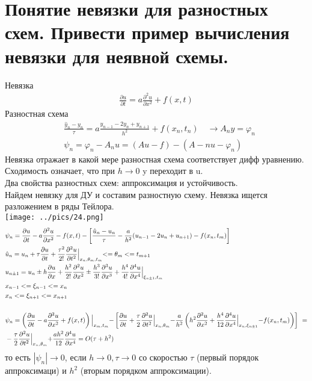 \documentclass[12pt,a4paper]{article}
\begin{document}
	\section{Понятие невязки для разностных схем. Привести пример вычисления невязки для неявной схемы.}	
	Невязка\\
	\begin{align*}
	\frac{\partial u}{\partial t} = a \frac{\partial^2 u}{\partial x^2} + f(x,t)
	\end{align*}
	Разностная схема \\
	\begin{align*}
	&\frac{\hat{y}_n - y_n}{\tau} = a \frac{y_{n-1} - 2y_n + y_{n+1}}{h^2} + f(x_n, t_n) \quad \longrightarrow A_n y = \varphi_n\\
	&\psi_n = \varphi_n - A_n u = (Au - f)-(A-nu-\varphi_n)
	\end{align*}
	Невязка отражает в какой мере разностная схема соответствует дифф уравнению. \\
	Сходимость означает, что при $h\rightarrow 0$ y переходит в u. \\
	Два свойства разностных схем: аппроксимация и устойчивость.\\
	Найдем невязку для ДУ и составим разностную схему. Невязка ищется разложением в ряды Тейлора.\\
	\texttt{[image: ../pics/24.png]}\\
	\begin{align*}
	&\psi_n = \frac{\partial u}{\partial t} - a \frac{\partial^2 u}{\partial x^2} - f (x,t) - \left[ \frac{\hat{u}_n - u_n}{\tau} - \frac{a}{h^2} (u_{n-1} - 2u_n + u_{n+1})-f(x_n, t_m)\right]\\
	&\hat{u}_n = u_n + \tau  \frac{\partial u}{\partial t} + \frac{\tau^2}{2!} \frac{\partial^2 u}{\partial t^2} \Bigl|_{x_n, \theta_m, t_m} <= \theta_m <= t_{m+1}\\
	&u_{n\pm 1} = u_n  \pm h \frac{\partial u}{\partial x} + \frac{h^2}{2!} \frac{\partial^2 u}{\partial x^2} \pm \frac{h^3}{3!} \frac{\partial^3 u}{\partial x^3}  + \frac{h^4}{4!} \frac{\partial^4 u}{\partial x^4} \Bigl|_{\xi_{n\pm 1}, t_m}\\
	&x_{n-1} <= \xi_{n-1} <= x_n\\
	&x_n <= \xi_{n+1} <= x_{n+1}\\\\
	&\psi_n = \left( \frac{\partial u}{\partial t} - a \frac{\partial^2 u}{\partial x^2} + f (x,t) \right)\Bigl|_{x_m, t_m} - \left[ \frac{\partial u}{\partial t} + \frac{\tau}{2}\frac{\partial^2 u}{\partial t^2}\Bigl|_{x_n, \theta_m} - \frac{a}{h^2} \left( h^2 \frac{\partial^2 u}{\partial x^2} +  \frac{h^4}{12} \frac{\partial^4 u}{\partial x^4} \Bigl|_{x_n, \xi_{n \pm 1}}  -f(x_n, t_m) \right) \right]\ = \\
	& -\frac{\tau}{2} \frac{\partial^2 u}{\partial t^2} \Bigl|_{x_n, \theta_m} + \frac{a h^2}{12}\frac{\partial^4 u}{\partial x^4} = O(\tau + h^2)
	\end{align*}
	то есть  $|\psi_n| \rightarrow 0$, если $h \rightarrow 0 , \tau \rightarrow 0$ со скоростью $\tau$ (первый порядок аппроксимаци) и $h^2$ (вторым порядком аппроксимации).
\end{document}
